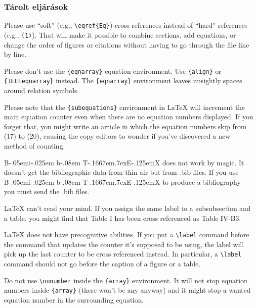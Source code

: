 \documentclass[conference]{IEEEtran}
\def\BibTeX{{\rm B\kern-.05em{\sc i\kern-.025em b}\kern-.08em
    T\kern-.1667em\lower.7ex\hbox{E}\kern-.125emX}}
\begin{document}
\subsubsection{Tárolt eljárások}

Please use ``soft'' (e.g., \verb|\eqref{Eq}|) cross references instead
of ``hard'' references (e.g., \verb|(1)|). That will make it possible
to combine sections, add equations, or change the order of figures or
citations without having to go through the file line by line.

Please don't use the \verb|{eqnarray}| equation environment. Use
\verb|{align}| or \verb|{IEEEeqnarray}| instead. The \verb|{eqnarray}|
environment leaves unsightly spaces around relation symbols.

Please note that the \verb|{subequations}| environment in {\LaTeX}
will increment the main equation counter even when there are no
equation numbers displayed. If you forget that, you might write an
article in which the equation numbers skip from (17) to (20), causing
the copy editors to wonder if you've discovered a new method of
counting.

{\BibTeX} does not work by magic. It doesn't get the bibliographic
data from thin air but from .bib files. If you use {\BibTeX} to produce a
bibliography you must send the .bib files. 

{\LaTeX} can't read your mind. If you assign the same label to a
subsubsection and a table, you might find that Table I has been cross
referenced as Table IV-B3. 

{\LaTeX} does not have precognitive abilities. If you put a
\verb|\label| command before the command that updates the counter it's
supposed to be using, the label will pick up the last counter to be
cross referenced instead. In particular, a \verb|\label| command
should not go before the caption of a figure or a table.

Do not use \verb|\nonumber| inside the \verb|{array}| environment. It
will not stop equation numbers inside \verb|{array}| (there won't be
any anyway) and it might stop a wanted equation number in the
surrounding equation.
\end{document}

